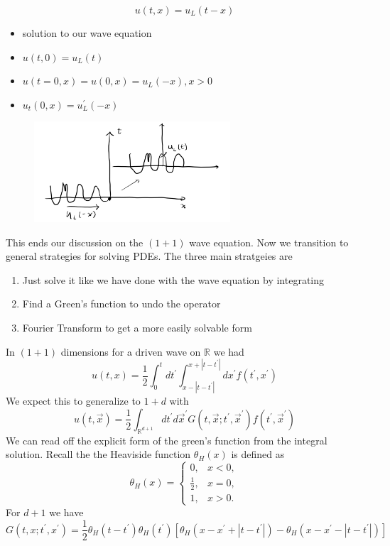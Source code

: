 \documentclass[11pt,a4paper]{article}
\begin{document}
$$
u(t,x) = u_{L}(t-x)
$$
\begin{itemize}
\item solution to our wave equation
\item $u(t,0) = u_{L}(t)$
\item $u(t=0,x) = u(0,x) = u_{L}(-x), x>0$
\item$u_{t}(0,x) = u_{L}^{\prime}(-x)$
\end{itemize}
\begin{figure}[H]
	\centering
	\includegraphics[width=0.65\textwidth]{fromLeft.png} %
\end{figure}
This ends our discussion on the $(1+1)$ wave equation. Now we transition to general strategies for solving PDEs.
The three main stratgeies are
\begin{enumerate}
\item Just solve it like we have done with the wave equation by integrating
\item Find a Green's function to undo the operator
\item Fourier Transform to get a more easily solvable form
\end{enumerate}
In $(1+1)$ dimensions for a driven wave on $\mathbb{R}$ we had 
$$
u(t,x) = \frac{1}{2}\int_{0}^{t}dt^{\prime}\int_{x-|t-t^{\prime}|}^{x+|t-t^{\prime}|}dx^{\prime}f(t^{\prime},x^{\prime})
$$
We expect this to generalize to $1+d$ with
$$
u(t,\vec{x})= \frac{1}{2}\int_{\mathbb{R}^{d+1}}dt^{\prime}d\vec{x}^{\prime}G(t,\vec{x};t^{\prime},\vec{x}^{\prime}) f(t^{\prime},\vec{x}^{\prime})
$$
We can read off the explicit form of the green's function from the integral solution. Recall the the Heaviside function $\theta_{H}(x)$ is defined as
\[
\theta_H(x) =
\begin{cases}
	0, & x < 0, \\
	\frac{1}{2}, & x = 0, \\
	1, & x > 0.
\end{cases}
\]
For $d+1$ we have
$$
G(t,x;t^{\prime},x^{\prime}) = \frac{1}{2}\theta_{H}(t-t^{\prime})\theta_{H}(t^{\prime})[\theta_{H}(x-x^{\prime}+|t-t^{\prime}|)-\theta_{H}(x-x^{\prime}-|t-t^{\prime}|)]
$$
\end{document}
